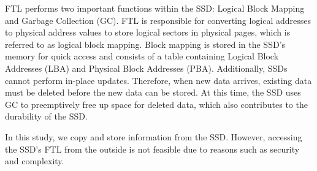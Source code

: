 FTL performs two important functions within the SSD: Logical Block Mapping and Garbage Collection (GC).
FTL is responsible for converting logical addresses to physical address values to store logical sectors in physical pages, which is referred to as logical block mapping.
Block mapping is stored in the SSD's memory for quick access and consists of a table containing Logical Block Addresses (LBA) and Physical Block Addresses (PBA). 
Additionally, SSDs cannot perform in-place updates. 
Therefore, when new data arrives, existing data must be deleted before the new data can be stored.
At this time, the SSD uses GC to preemptively free up space for deleted data, which also contributes to the durability of the SSD.

In this study, we copy and store information from the SSD.
However, accessing the SSD's FTL from the outside is not feasible due to reasons such as security and complexity.
